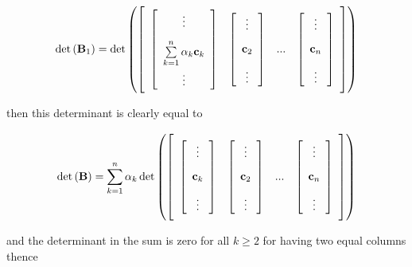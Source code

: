 \begin{equation} \det\left(\mathbf{B}_1\right) = \det\left( \left[\raisebox{15mm}{} \begin{array}{cccc} \left[\begin{array}{c} \vdots \\[3mm] \sum\limits_{k=1}^n \alpha_k\mathbf{c}_k \\[3mm] \vdots \end{array}\right] & \left[\begin{array}{c} \vdots \\[3mm] \mathbf{c}_2 \\[3mm] \vdots \end{array}\right] & ... & \left[\begin{array}{c} \vdots \\[3mm] \mathbf{c}_n \\[3mm] \vdots \end{array}\right]\end{array}\right]\right) \end{equation}

	\noindent then this determinant is clearly equal to

\begin{equation}  \det\left(\mathbf{B}\right) = \sum\limits_{k=1}^n \alpha_k \det\left( \left[\raisebox{15mm}{} \begin{array}{cccc} \left[\begin{array}{c} \vdots \\[3mm] \mathbf{c}_k \\[3mm] \vdots \end{array}\right] & \left[\begin{array}{c} \vdots \\[3mm] \mathbf{c}_2 \\[3mm] \vdots \end{array}\right] & ... & \left[\begin{array}{c} \vdots \\[3mm] \mathbf{c}_n \\[3mm] \vdots \end{array}\right]\end{array}\right]\right) \end{equation}

	\noindent and the determinant in the sum is zero for all $k\geq 2$ for having two equal columns thence

